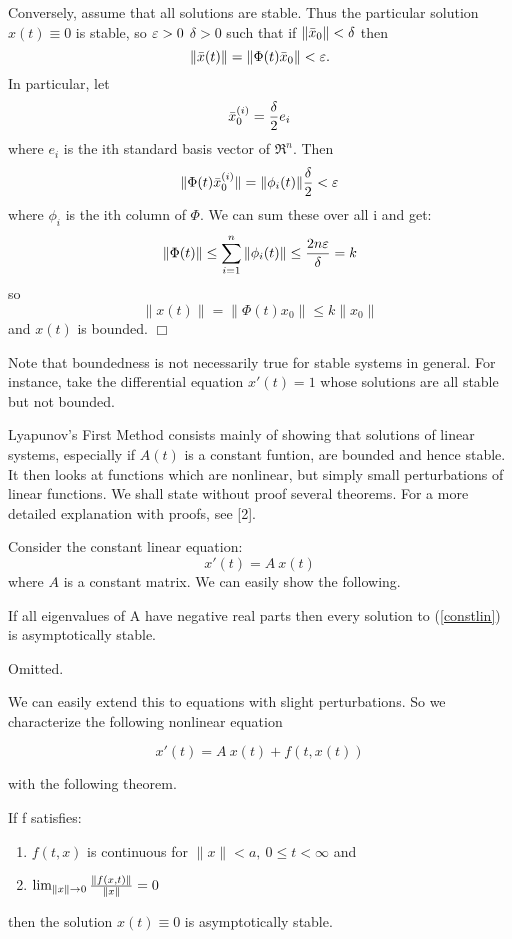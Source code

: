 \documentclass[nols]{tufte-handout}
\theoremstyle{definition}
\begin{document}
Conversely, assume that all solutions are stable.  Thus the particular
solution $x(t) \equiv 0$ is stable, so \a $\varepsilon > 0$ \e $\delta > 0$
such that if $\| \bar{x}_0 \| < \delta$ then 
$$\| \bar{x} (t) \| = \| \Phi (t) \bar{x}_0\| < \varepsilon.$$
In particular, let 
$$\bar{x}_0^{(i)} = {\delta \over 2} e_i $$
where $e_i$ is the ith standard basis vector of $\Re^n$.  Then
$$\| \Phi (t) \bar{x}_0^{(i)} \| = \| \phi_i(t) \| {\delta \over 2} <
\varepsilon$$
where $\phi_i$ is the ith column of $\Phi$.  We can sum these over all
i and get:
$$\| \Phi (t) \| \le \sum^n_{i=1} \| \phi_i(t) \| \le {2n \varepsilon\over
\delta} = k$$
so $$\| x(t) \| = \| \Phi (t) x_0 \| \le k \| x_0 \|$$
and $x(t)$ is bounded. $\Box$

Note that boundedness is not necessarily true for stable systems in
general.  For instance, take the differential equation $x'(t) = 1$
whose solutions are all stable but not bounded.

Lyapunov's First Method consists mainly of showing that solutions of linear
systems, especially if $A(t)$ is a constant funtion, are bounded and
hence stable.  It then looks at functions which are nonlinear, but
simply small perturbations of linear functions.  We shall state
without proof several theorems.  For a more detailed explanation with
proofs, see [2].

Consider the constant linear equation:
\begin{equation}
	x'(t) = A \ x(t)
	\label{constlin}
\end{equation}
where $A$ is a constant matrix.  We can easily show the following.

\begin{thm}
	If all eigenvalues of A have negative real parts then every
solution to (\ref{constlin}) is asymptotically stable.
\end{thm}

\pf Omitted.

We can easily extend this to equations with slight perturbations.  So
we characterize the following nonlinear equation

\begin{equation}
	x'(t) = A \ x(t) + f(t,x(t))
	\label{nonlinear}
\end{equation}

with the following theorem.

\begin{thm}
	If f satisfies:

\begin{enumerate}
\item $f(t,x)$ is continuous for $\| x \| < a, \ 0 \le t <\infty$ and
\item $\lim_{\| x \| \rightarrow 0} {\| f(x,t) \| \over \| x \|} = 0$ 
\end{enumerate}
then the solution $x(t) \equiv 0$ is asymptotically stable.
\end{thm}
\end{document}
